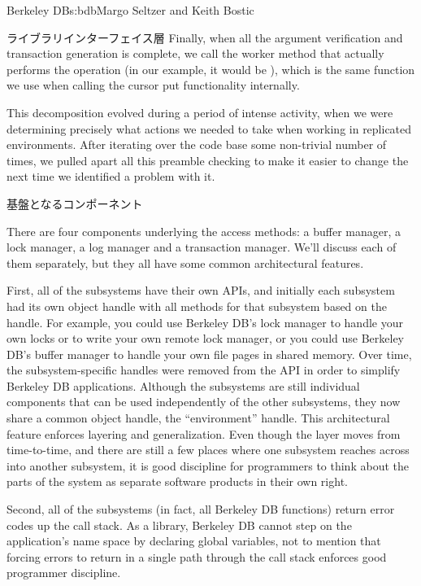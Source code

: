 \begin{aosachapter}{Berkeley DB}{s:bdb}{Margo Seltzer and Keith Bostic}
\begin{aosasect1}{ライブラリインターフェイス層}
Finally, when all the argument verification and transaction generation
is complete, we call the worker method that actually performs the
operation (in our example, it would be ), which is
the same function we use when calling the cursor put functionality
internally.

This decomposition evolved during a period of intense activity, when
we were determining precisely what actions we needed to take when
working in replicated environments. After iterating over the code base
some non-trivial number of times, we pulled apart all this preamble
checking to make it easier to change the next time we identified a
problem with it.

\end{aosasect1}

\begin{aosasect1}{基盤となるコンポーネント}

There are four components underlying the access methods: a buffer
manager, a lock manager, a log manager and a transaction
manager. We'll discuss each of them separately, but they all have some
common architectural features.

First, all of the subsystems have their own APIs, and initially each
subsystem had its own object handle with all methods for that
subsystem based on the handle. For example, you could use Berkeley
DB's lock manager to handle your own locks or to write your own remote
lock manager, or you could use Berkeley DB's buffer manager to handle
your own file pages in shared memory. Over time, the
subsystem-specific handles were removed from the API in order to
simplify Berkeley DB applications. Although the subsystems are still
individual components that can be used independently of the other
subsystems, they now share a common object handle, the 
``environment'' handle. This architectural feature enforces layering
and generalization. Even though the layer moves from time-to-time, and
there are still a few places where one subsystem reaches across into
another subsystem, it is good discipline for programmers to think about
the parts of the system as separate software products in their own right.

Second, all of the subsystems (in fact, all Berkeley DB functions)
return error codes up the call stack.  As a library, Berkeley DB
cannot step on the application's name space by declaring global
variables, not to mention that forcing errors to return in a single
path through the call stack enforces good programmer discipline. 


\end{aosasect1}
\end{aosachapter}
